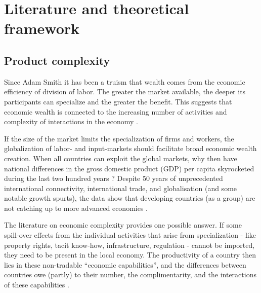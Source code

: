 \documentclass[11pt]{article}
\begin{document}
\newpage

\section{Literature and theoretical framework}%
\label{sec:framework}


\subsection{Product complexity}
\label{sec:frame-product-complexity}

Since Adam Smith it has been a truism that wealth comes from the economic efficiency of division of labor. The greater the market available, the deeper its participants can specialize and the greater the benefit. This suggests that economic wealth is connected to the increasing number of activities and complexity of interactions in the economy \citep{romer_endogenous_1990}.

If the size of the market limits the specialization of firms and workers, the globalization of labor- and input-markets should facilitate broad economic wealth creation. When all countries can exploit the global markets, why then have national differences in the gross domestic product (GDP) per capita skyrocketed during the last two hundred years \citep{pritchett_divergence_1997}? Despite 50 years of unprecedented international connectivity, international trade, and globalisation (and some notable growth spurts), the data show that developing countries (as a group) are not catching up to more advanced economies \citep{johnson_what_2020}.

The literature on economic complexity provides one possible answer. If some spill-over effects from the individual activities that arise from  specialization - like property rights, tacit know-how, infrastructure, regulation - cannot be imported, they need to be present in the local economy. The productivity of a country then lies in these non-tradable ``economic capabilities'', and the differences between countries owe (partly) to their number, the complimentarity, and the interactions of these capabilities \citep{hidalgo_product_2007,hausmann_atlas_2013}.
\end{document}
